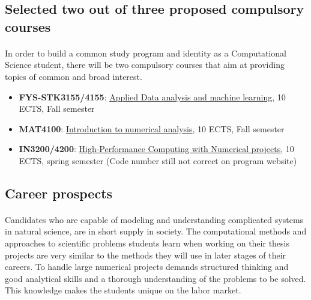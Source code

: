 \documentclass[%
oneside,                 %
final,                   %
10pt]{article}
\begin{document}
\subsection{Selected two out of three proposed compulsory courses}

\paragraph{}
In order to build a common study program and identity as a Computational Science student, there will be two compulsory courses that aim at providing topics of common and broad interest.


\begin{itemize}
\item \textbf{FYS-STK3155/4155}: \href{{https://www.uio.no/studier/emner/matnat/fys/FYS-STK4155/index-eng.html}}{Applied Data analysis and machine learning}, 10 ECTS, Fall semester

\item \textbf{MAT4100}: \href{{https://www.uio.no/studier/emner/matnat/math/MAT4110/index-eng.html}}{Introduction to numerical analysis}, 10 ECTS, Fall semester

\item \textbf{IN3200/4200}: \href{{https://www.uio.no/studier/emner/matnat/ifi/IN3200/index-eng.html}}{High-Performance Computing with Numerical projects}, 10 ECTS, spring semester (Code number still not correct on program website)
\end{itemize}

\noindent





\subsection{Career prospects}


\paragraph{}
Candidates who are capable of modeling and understanding complicated
systems in natural science, are in short supply in society.  The
computational methods and approaches to scientific problems students learn
when working on their thesis projects are very similar to the methods
they will use in later stages of their careers.  To handle large
numerical projects demands structured thinking and good analytical
skills and a thorough understanding of the problems to be solved. This
knowledge makes the students unique on the labor market.
\end{document}
